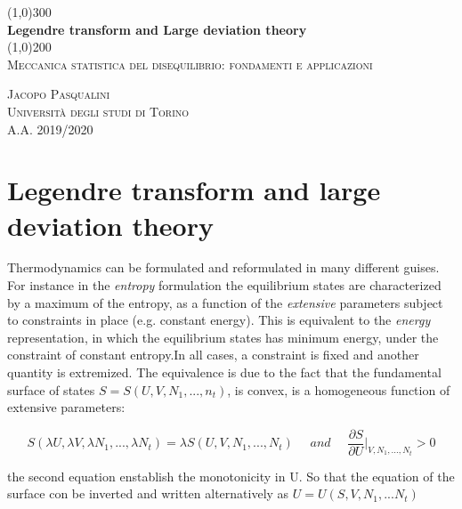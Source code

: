 \documentclass{article}
\begin{document}
\begin{titlepage}
	\begin{center}
	
	\line(1,0){300}\\
	[5mm]
	\huge{\bfseries Legendre transform and Large deviation theory}\\
	[2mm]
	\line(1,0){200}\\
	[2cm]
	\textsc{\Large Meccanica statistica del disequilibrio: fondamenti e applicazioni} \\
	[8cm]
	
	\end{center}
	
	\begin{flushright}
	\textsc{\LARGE Jacopo Pasqualini}\\
	[0.5cm]
	\textsc{\large Università degli studi di Torino\\
	[0.5cm]
	A.A. 2019/2020 }
	\end{flushright}
	
\end{titlepage}

\section{Legendre transform and large deviation theory}\label{sec:langapp}

Thermodynamics can be formulated and reformulated in many different guises. For instance in the \emph{entropy} formulation the equilibrium states are characterized by a maximum of the entropy, as a function of the \emph{extensive} parameters subject to constraints in place (e.g. constant energy).
This is  equivalent to the \emph{energy} representation, in which the equilibrium states has minimum energy, under the constraint of constant entropy.In all cases, a constraint is fixed and another quantity is extremized. The equivalence is due to the fact that the fundamental surface of states $S=S(U,V,N_1,...,n_t)$, is convex, is a homogeneous function of extensive parameters:

\begin{equation}
S(\lambda U, \lambda V, \lambda N_1, ... , \lambda N_t) = \lambda S(U,V,N_1,...,N_t) \quad \textit{ and } \quad \frac{\partial S}{\partial U} \Big |_{V,N_1,...,N_t} > 0
\end{equation}

the second equation enstablish the monotonicity in U. So that the equation of the surface con be inverted and written alternatively as $U=U(S,V,N_1,...N_t)$
\end{document}
